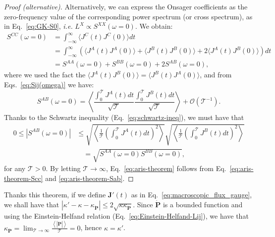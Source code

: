 \smallskip
\begin{proof}[Proof (alternative)]
Alternatively, we can express the Onsager coefficients as the zero-frequency value of the corresponding power spectrum (or cross spectrum), as in Eq.~\eqref{eq:GK-S0}, \emph{i.e.} $L^{X} \propto S^{XX}(\omega=0)$. We obtain:
\begin{align}
    S^{CC}(\omega=0) &= \int_{-\infty}^\infty \langle J^C(t) J^C(0) \rangle dt \nonumber\\
        &=\int_{-\infty}^\infty \left(\langle J^A(t) J^A(0) \rangle + \langle J^B(t) J^B(0) \rangle + 2\langle J^A(t) J^B(0) \rangle \right) dt  \nonumber\\
        &= S^{AA}(\omega=0) + S^{BB}(\omega=0) + 2 S^{AB}(\omega=0), \label{eq:aris-theorem-Scc}
\end{align}
where we used the fact the $\langle J^A(t) J^B(0) \rangle = \langle J^B(t) J^A(0) \rangle$, and from Eqs.~\eqref{eq:Sij(omega)} we have:
\begin{equation}
    S^{AB}(\omega=0) = \left\langle \frac{\int_0^\mathcal{T} J^A(t) dt}{\sqrt{\mathcal{T}}} \frac{\int_0^\mathcal{T} J^B(t) dt}{\sqrt{\mathcal{T}}} \right\rangle + \mathcal{O}(\mathcal{T}^{-1}) .
\end{equation}
Thanks to the Schwartz inequality (Eq.~\eqref{eq:schwartz-ineq}), we must have that
\begin{equation}
\begin{aligned}
    0 \leq \left|S^{AB}(\omega=0)\right| &\leq \sqrt{\left\langle\frac{1}{\mathcal{T}}\left(\int_0^\mathcal{T} J^A(t) dt\right)^2\right\rangle} \sqrt{\left\langle\frac{1}{\mathcal{T}}\left(\int_0^\mathcal{T} J^B(t) dt\right)^2\right\rangle} \\
    &\quad = \sqrt{S^{AA}(\omega=0) S^{BB}(\omega=0)} ,
\end{aligned} \label{eq:aris-theorem-Sab}
\end{equation}
for any $\mathcal{T}>0$. By letting $\mathcal{T}\rightarrow\infty$, Eq.~\eqref{eq:aris-theorem} follows from Eq.~\eqref{eq:aris-theorem-Scc} and \eqref{eq:aris-theorem-Sab}.
\end{proof}

\bigskip
Thanks this theorem, if we define $\mathbf{J}'(t)$ as in Eq.~\eqref{eq:macroscopic_flux_gauge}, we shall have that $\left| \kappa' - \kappa - \kappa_{\dot{\mathbf{P}}} \right| \leq 2 \sqrt{\kappa \kappa_{\dot{\mathbf{P}}}}$. Since $\mathbf{\dot{P}}$ is a bounded function and using the Einstein-Helfand relation (Eq.~\ref{eq:Einstein-Helfand-Lij}), we have that $\kappa_{\dot{\mathbf{P}}} = \lim_{\mathcal{T}\rightarrow\infty} \frac{\left\langle |\dot{\mathbf{P}}| \right\rangle}{\mathcal{T}} = 0$, hence $\kappa = \kappa'$. 

